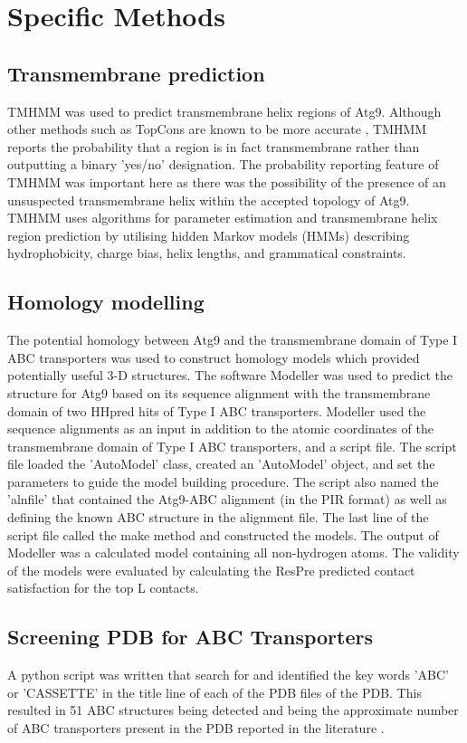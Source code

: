 \section{Specific Methods}
\subsection{Transmembrane prediction}
TMHMM \cite{krogh2001predicting} was used to predict transmembrane helix regions of Atg9.  Although other methods such as TopCons are known to be more accurate \cite{Tsirigos2015}, TMHMM reports the probability that a region is in fact transmembrane rather than outputting a binary 'yes/no' designation.  The probability reporting feature of TMHMM was important here as there was the possibility of the presence of an unsuspected transmembrane helix within the accepted topology of Atg9. TMHMM uses algorithms for parameter estimation and transmembrane helix region prediction by utilising hidden Markov models (HMMs) describing hydrophobicity, charge bias, helix lengths, and grammatical constraints. 

\subsection{Homology modelling}
The potential homology between Atg9 and the transmembrane domain of Type I ABC transporters was used to construct homology models which provided potentially useful 3-D structures. The software Modeller \cite{eswar2006comparative} was used to predict the structure for Atg9 based on its sequence alignment with the transmembrane domain of two HHpred hits of Type I ABC transporters. Modeller used the sequence alignments as an input in addition to the atomic coordinates of the transmembrane domain of Type I ABC transporters, and a script file.  The script file loaded the 'AutoModel' class, created an 'AutoModel' object, and set the parameters to guide the model building procedure. The script also named the 'alnfile' that contained the Atg9-ABC alignment (in the PIR format) as well as defining the known ABC structure in the alignment file.  The last line of the script file called the make method and constructed the models. The output of Modeller was a calculated model containing all non-hydrogen atoms.  The validity of the models were evaluated by calculating the ResPre \cite{yang2019genetic} predicted contact satisfaction for the top L contacts. 

\subsection{Screening PDB for ABC Transporters}
A python script was written that search for and identified the key words 'ABC' or 'CASSETTE' in the title line of each of the PDB files of the PDB.  This resulted in 51 ABC structures being detected and being the approximate number of ABC transporters present in the PDB reported in the literature 
\cite{wilkens2015structure,hegedHus2021alphafold2}.

